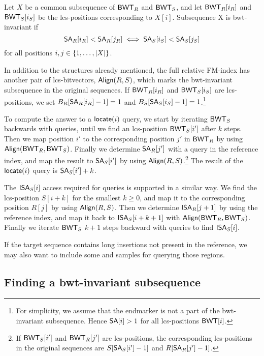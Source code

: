 \begin{definition}\label{def:bwt-invariant}
Let $X$ be a common subsequence of $\mathsf{BWT}_{R}$ and $\mathsf{BWT}_{S}$, and let
$\mathsf{BWT}_{R}[i_{R}]$ and $\mathsf{BWT}_{S}[i_{S}]$ be the lcs-positions corresponding to
$X[i]$. Subsequence X is bwt-invariant if
$$
\mathsf{SA}_{R}[i_{R}] < \mathsf{SA}_{R}[j_{R}] \iff \mathsf{SA}_{S}[i_{S}] < \mathsf{SA}_{S}[j_{S}]
$$
for all positions $i, j \in \{ 1, \dotsc, \lvert X \rvert \}$.
\end{definition}

In addition to the structures already mentioned, the full relative FM-index
has another pair of lcs-bitvectors, $\mathsf{Align}(R,S)$, which marks the
bwt-invariant subsequence in the original sequences. If $\mathsf{BWT}_{R}[i_{R}]$ and
$\mathsf{BWT}_{S}[i_{S}]$ are lcs-positions, we set $B_{R}[\mathsf{SA}_{R}[i_{R}]-1] = 1$ and
$B_{S}[\mathsf{SA}_{S}[i_{S}]-1] = 1$.\footnote{For simplicity, we assume that the
endmarker is not a part of the bwt-invariant subsequence. Hence $\mathsf{SA}[i] > 1$
for all lcs-positions $\mathsf{BWT}[i]$.}

To compute the answer to a $\mathsf{locate}(i)$ query, we start by iterating
$\mathsf{BWT}_{S}$ backwards with \LF{} queries, until we find an lcs-position
$\mathsf{BWT}_{S}[i']$ after $k$ steps. Then we map position $i'$ to the corresponding
position $j'$ in $\mathsf{BWT}_{R}$ by using $\mathsf{Align}(\mathsf{BWT}_{R},\mathsf{BWT}_{S})$. Finally we
determine $\mathsf{SA}_{R}[j']$ with a \locate{} query in the reference index, and map
the result to $\mathsf{SA}_{S}[i']$ by using $\mathsf{Align}(R,S)$.\footnote{If $\mathsf{BWT}_{S}[i']$
and $\mathsf{BWT}_{R}[j']$ are lcs-positions, the corresponding lcs-positions in the
original sequences are $S[\mathsf{SA}_{S}[i']-1]$ and $R[\mathsf{SA}_{R}[j']-1]$.} The result
of the $\mathsf{locate}(i)$ query is $\mathsf{SA}_{S}[i']+k$.

The $\mathsf{ISA}_{S}[i]$ access required for \extract{} queries is supported in a
similar way. We find the lcs-position $S[i+k]$ for the smallest $k \ge 0$, and
map it to the corresponding position $R[j]$ by using $\mathsf{Align}(R,S)$. Then we
determine $\mathsf{ISA}_{R}[j+1]$ by using the reference index, and map it back to
$\mathsf{ISA}_{S}[i+k+1]$ with $\mathsf{Align}(\mathsf{BWT}_{R},\mathsf{BWT}_{S})$. Finally we iterate
$\mathsf{BWT}_{S}$ $k+1$ steps backward with \LF{} queries to find $\mathsf{ISA}_{S}[i]$.

If the target sequence contains long
insertions not present in the reference, we may also want to include
some \SA{} and \ISA{} samples for querying those regions.

\subsection{Finding a bwt-invariant subsequence}


